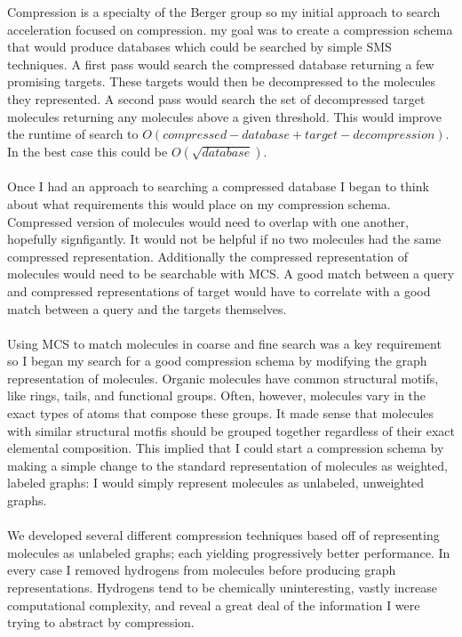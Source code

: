 \documentclass[DIV=calc, paper=a4, fontsize=12pt, twocolumn]{scrartcl}	 %
\begin{document}
Compression is a specialty of the Berger group so my initial approach to search acceleration focused on compression. my goal was to create a compression schema that would produce databases which could be searched by simple SMS techniques. A first pass would search the compressed database returning a few promising targets. These targets would then be decompressed to the molecules they represented. A second pass would search the set of decompressed target molecules returning any molecules above a given threshold. This would improve the runtime of search to $O(compressed-database + target-decompression)$. In the best case this could be $O(\sqrt{database})$.
\\\\
Once I had an approach to searching a compressed database I began to think about what requirements this would place on my compression schema. Compressed version of molecules would need to overlap with one another, hopefully signfigantly. It would not be helpful if no two molecules had the same compressed representation. Additionally the compressed representation of molecules would need to be searchable with MCS. A good match between a query and compressed representations of target would have to correlate with a good match between a query and the targets themselves. 
\\\\
Using MCS to match molecules in coarse and fine search was a key requirement so I began my search for a good compression schema by modifying the graph representation of molecules. Organic molecules have common structural motifs, like rings, tails, and functional groups. Often, however, molecules vary in the exact types of atoms that compose these groups. It made sense that molecules with similar structural motfis should be grouped together regardless of their exact elemental composition. This implied that I could start a compression schema by making a simple change to the standard representation of molecules as weighted, labeled graphs: I would simply represent molecules as unlabeled, unweighted graphs. 
\\\\
We developed several different compression techniques based off of representing molecules as unlabeled graphs; each yielding progressively better performance. In every case I removed hydrogens from molecules before producing graph representations. Hydrogens tend to be chemically uninteresting, vastly increase computational complexity, and reveal a great deal of the information I were trying to abstract by compression.
\end{document}
